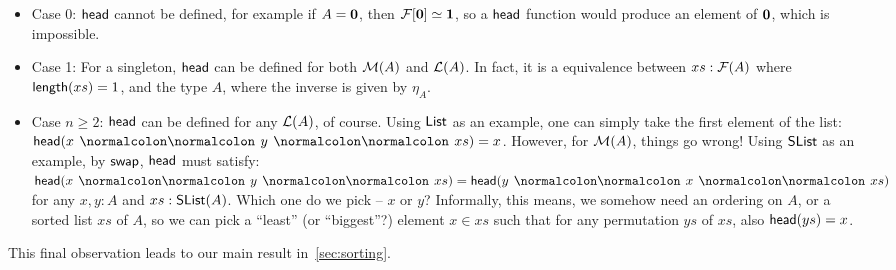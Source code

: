 \begin{itemize}
    \item
          Case 0: $\operatorname{\mathsf{head}}$ cannot be defined, for example if $A = {\mathbf{0}}$, then $\mathcal{F}[{\mathbf{0}}] \mathrel{\simeq} {\mathbf{1}}$,
          so a $\operatorname{\mathsf{head}}$ function would produce an element of ${\mathbf{0}}$, which is impossible.

    \item
          Case 1: For a singleton, $\operatorname{\mathsf{head}}$ can be defined for both $\mathcal{M}(A)$ and $\mathcal{L}(A)$.
          In fact, it is a equivalence between $xs : \mathcal{F}(A)$ where $\operatorname{\mathsf{length}}(xs) = 1$, and the type $A$,
          where the inverse is given by $\eta_A$.

    \item
          Case $n \geq 2$: $\operatorname{\mathsf{head}}$ can be defined for any $\mathcal{L}(A)$, of course.
          Using $\operatorname{\mathsf{List}}$ as an example, one can simply take the first element of the list:
          $\term{head}(x \cons y \cons xs) = x$.
          However, for $\mathcal{M}(A)$, things go wrong!
          Using $\operatorname{\mathsf{SList}}$ as an example, by $\operatorname{\mathsf{swap}}$, $\operatorname{\mathsf{head}}$ must satisfy:
          $\term{head}(x \cons y \cons xs) = \term{head}(y \cons x \cons xs)$ for any $x, y : A$ and $xs : \operatorname{\mathsf{SList}}(A)$.
          Which one do we pick -- $x$ or $y$?
          Informally, this means, we somehow need an ordering on $A$, or a sorted list $xs$ of $A$,
          so we can pick a ``least'' (or ``biggest''?) element $x \in xs$ such that for any permutation $ys$ of $xs$,
          also $\operatorname{\mathsf{head}}(ys) = x$.
\end{itemize}

This final observation leads to our main result in~\cref{sec:sorting}.
